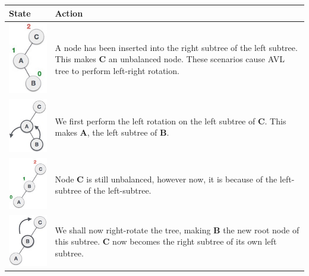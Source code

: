 \begin{longtable}{| M{.20\textwidth} | p{.80\textwidth} |} 
\hline
\textbf{State} & \textbf{Action} \\
\hline
\includegraphics[scale=.40]{images/right_subtree_of_left_subtree.jpg} & A node has been inserted into the right subtree of the left subtree. This makes \textbf{C} an unbalanced node. These scenarios cause AVL tree to perform left-right rotation. \\ 
\hline
\includegraphics[scale=.40]{images/subtree_left_rotation.jpg} & We first perform the left rotation on the left subtree of \textbf{C}. This makes \textbf{A}, the left subtree of \textbf{B}. \\ 
\hline
\includegraphics[scale=.40]{images/left_unbalanced_tree.jpg} & Node \textbf{C} is still unbalanced, however now, it is because of the left-subtree of the left-subtree. \\ 
\hline
\includegraphics[scale=.40]{images/right_rotation.jpg} & We shall now right-rotate the tree, making \textbf{B} the new root node of this subtree. \textbf{C} now becomes the right subtree of its own left subtree. \\ 

\end{longtable}
